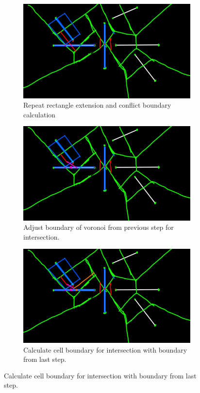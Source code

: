 \documentclass{article}
\begin{document}
\begin{figure}[h!]
	\centering
	\begin{subfigure}{0.3\linewidth}
		\includegraphics[width=\linewidth]{Step7.png}
		\caption{Repeat rectangle extension and conflict boundary calculation}
		\label{fig:Step7}
	\end{subfigure}%
	\hfill
	\begin{subfigure}{0.3\linewidth}
		\includegraphics[width=\linewidth]{Step8.png}
		\caption{Adjust boundary of voronoi from previous step for intersection.}
		\label{fig:Step8}
	\end{subfigure}%
	\hfill
	\begin{subfigure}{0.3\linewidth}
		\includegraphics[width=\linewidth]{Step9.png}
		\caption{Calculate cell boundary for intersection with boundary from last step.}
		\label{fig:Step9}
	\end{subfigure}
\end{figure}
\end{document}

